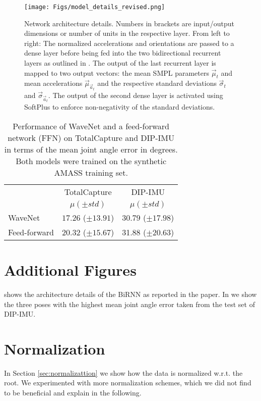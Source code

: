 \documentclass[acmtog]{acmart}
\begin{document}
\begin{figure*}[tbh]
\centering
\texttt{[image: Figs/model\_details\_revised.png]}
\caption{Network architecture details. Numbers in brackets are input/output dimensions or number of units in the respective layer. From left to right: The normalized accelerations and orientations are passed to a dense layer before being fed into the two bidirectional recurrent layers as outlined in . The output of the last recurrent layer is mapped to two output vectors: the mean SMPL parameters $\vec{\mu}_t$ and mean accelerations $\vec{\mu}_{\vec{a}_t}$ and the respective standard deviations $\vec{\sigma}_t$ and $\vec{\sigma}_{\vec{a}_t}$. The output of the second dense layer is activated using SoftPlus to enforce non-negativity of the standard deviations.}
\label{fig:architecture}
\end{figure*}\begin{table}[bht]
	\caption{Performance of WaveNet and a feed-forward network (FFN) on TotalCapture and DIP-IMU in terms of the mean joint angle error in degrees. Both models were trained on the synthetic AMASS training set.}
	
	\begin{tabular}{l c c}
		\toprule
		& {TotalCapture} & {DIP-IMU}\\
		& $\mu (\pm std)$  & $\mu (\pm std)$ \\
		\hline
		WaveNet & $17.26$ ($\pm 13.91$) & $30.79$ ($\pm 17.98$) \\
		\hline
        Feed-forward & $20.32$ ($\pm 15.67$) & 31.88 ($\pm 20.63$) \\
        \hline
	\end{tabular}
    \label{tab:additional_architectures}
\end{table}\section{Additional Figures}\label{app:failure_cases} shows the architecture details of the BiRNN as reported in the paper. In  we show the three poses with the highest mean joint angle error taken from the test set of DIP-IMU.

\section{Normalization}\label{sec:appendix_normalization}
In Section \ref{sec:normalizattion} we show how the data is normalized w.r.t. the root. We experimented with more normalization schemes, which we did not find to be beneficial and explain in the following.
\end{document}
